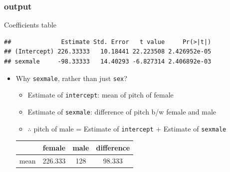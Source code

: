 \documentclass{beamer}\usepackage[]{graphicx}\usepackage[]{color}
\makeatletter
\newenvironment{kframe}{%
 \def\at@end@of@kframe{}%
 \ifinner\ifhmode%
  \def\at@end@of@kframe{\end{minipage}}%
  \begin{minipage}{\columnwidth}%
 \fi\fi%
 \def\FrameCommand##1{\hskip\@totalleftmargin \hskip-\fboxsep
 \colorbox{shadecolor}{##1}\hskip-\fboxsep
     \hskip-\linewidth \hskip-\@totalleftmargin \hskip\columnwidth}%
 \MakeFramed {\advance\hsize-\width
   \@totalleftmargin\z@ \linewidth\hsize
   \@setminipage}}%
 {\par\unskip\endMakeFramed%
 \at@end@of@kframe}
\newenvironment{knitrout}{}{} %
\makeatother
\begin{document}
\begin{frame}[fragile]
\frametitle{output}
Coefficients table
\begin{knitrout}\scriptsize
{}\color{fgcolor}\begin{kframe}
\begin{verbatim}
##              Estimate Std. Error   t value     Pr(>|t|)
## (Intercept) 226.33333   10.18441 22.223508 2.426952e-05
## sexmale     -98.33333   14.40293 -6.827314 2.406892e-03
\end{verbatim}
\end{kframe}
\end{knitrout}
\begin{itemize}
\item Why \texttt{sexmale}, rather than just \texttt{sex}?
	\begin{itemize}
	\item Estimate of \texttt{intercept}: mean of pitch of female 
	\item Estimate of \texttt{sexmale}: difference of pitch b/w female and male
	\item $\therefore$ pitch of male = Estimate of \texttt{intercept} + Estimate of \texttt{sexmale}
	\end{itemize}

\vspace{9pt}
\begin{center}
\begin{tabular}{cccc}

\toprule
& female & male & difference \\
\midrule
mean & 226.333 & 128 & 98.333 \\
\bottomrule
\end{tabular}
\end{center}
\end{itemize}
\end{frame}
\end{document}
